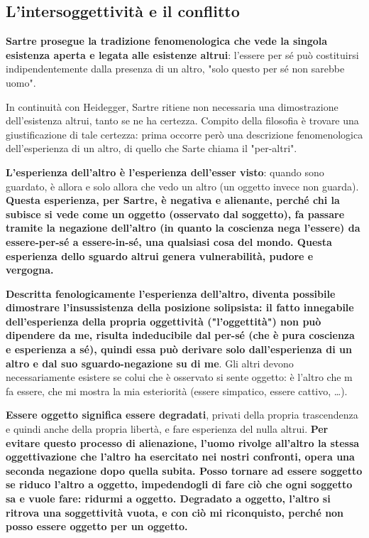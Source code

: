 \subsection{L'intersoggettività e il conflitto}

\textbf{Sartre prosegue la tradizione fenomenologica che vede la singola esistenza aperta e legata alle esistenze altrui}: l'essere per sé può costituirsi indipendentemente dalla presenza di un altro, "solo questo per sé non sarebbe uomo".

In continuità con Heidegger, Sartre ritiene non necessaria una dimostrazione dell'esistenza altrui, tanto se ne ha certezza.
Compito della filosofia è trovare una giustificazione di tale certezza: prima occorre però una descrizione fenomenologica dell'esperienza di un altro, di quello che Sarte chiama il "per-altri".

\textbf{L'esperienza dell'altro è l'esperienza dell'esser visto}: quando sono guardato, è allora e solo allora che vedo un altro (un oggetto invece non guarda). \textbf{Questa esperienza, per Sartre, è negativa e alienante, perché chi la subisce si vede come un oggetto (osservato dal soggetto), fa passare tramite la negazione dell'altro (in quanto la coscienza nega l'essere) da essere-per-sé a essere-in-sé, una qualsiasi cosa del mondo. Questa esperienza dello sguardo altrui genera vulnerabilità, pudore e vergogna.}

\textbf{Descritta fenologicamente l'esperienza dell'altro, diventa possibile dimostrare l'insussistenza della posizione solipsista: il fatto innegabile dell'esperienza della propria oggettività ("l'oggettità") non può dipendere da me, risulta indeducibile dal per-sé (che è pura coscienza e esperienza a sé), quindi essa può derivare solo dall'esperienza di un altro e dal suo sguardo-negazione su di me}. Gli altri devono necessariamente esistere se colui che è osservato si sente oggetto: è l'altro che m fa essere, che mi mostra la mia esteriorità (essere simpatico, essere cattivo, \dots).

\textbf{Essere oggetto significa essere degradati}, privati della propria trascendenza e quindi anche della propria libertà, e fare esperienza del nulla altrui. \textbf{Per evitare questo processo di alienazione, l'uomo  rivolge all'altro la stessa oggettivazione che l'altro ha esercitato nei nostri confronti, opera una seconda negazione dopo quella subita. Posso tornare ad essere soggetto se riduco l'altro a oggetto, impedendogli di fare ciò che ogni soggetto sa e vuole fare: ridurmi a oggetto. Degradato a oggetto, l'altro si ritrova una soggettività vuota, e con ciò mi riconquisto, perché non posso essere oggetto per un oggetto.}

